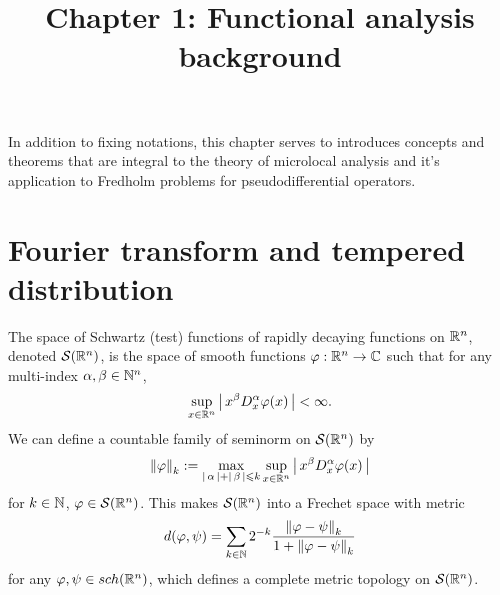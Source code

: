 \documentclass[12pt]{article}
\title{Chapter 1: Functional analysis background}
\date{}
\begin{document}
\maketitle

In addition to fixing notations, this chapter serves to introduces concepts and theorems that are integral to the theory of microlocal analysis and it's application to Fredholm problems for pseudodifferential operators. 

\section{Fourier transform and tempered distribution}

\begin{fdefinition}
    The space of Schwartz (test) functions of rapidly decaying functions on $\R^n$, denoted $\sch(\R^n)$, is the space of smooth functions $\varphi : \R^n \to \C$ such that for any multi-index $\alpha, \beta \in \N^n$, 
    \begin{align}
    \sup_{x \in \R^n} \abs{x^\beta D^\alpha_x \varphi(x)} < \infty. 
    \end{align}
    We can define a countable family of seminorm on $\sch(\R^n)$ by 
    \begin{align}
    \norm[\varphi]_k := \max_{\abs{\alpha} + \abs{\beta} \leq k} \sup_{x \in \R^n} \abs{x^\beta D^\alpha_x \varphi(x)}
    \end{align}
    for $k \in \N$, $\varphi \in \sch(\R^n)$. This makes $\sch(\R^n)$ into a Frechet space with metric 
    \begin{align*}
    d(\varphi, \psi) = \sum_{k \in \N} 2^{-k} \frac{\norm[\varphi - \psi]_k}{1 + \norm[\varphi - \psi]_k} 
    \end{align*}
    for any $\varphi, \psi \in \\sch(\R^n)$, which defines a complete metric topology on $\sch(\R^n)$. 
\end{fdefinition}
\end{document}

